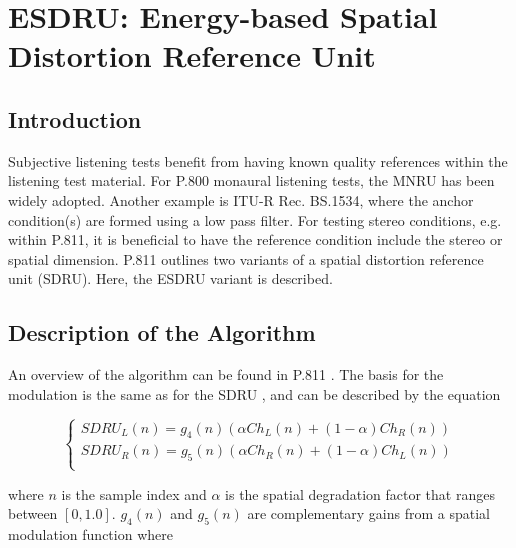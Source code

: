 
\chapter{ESDRU: Energy-based Spatial Distortion Reference Unit}

\section{Introduction}

Subjective listening tests benefit from having known quality references within
the listening test material. For P.800 monaural listening tests, the MNRU has
been widely adopted. Another example is ITU-R Rec. BS.1534, where the anchor condition(s)
are formed using a low pass filter. For testing stereo conditions, e.g. within
P.811, it is beneficial to have the reference condition include the stereo or 
spatial dimension. P.811 outlines two variants of a spatial distortion reference
unit (SDRU). Here, the ESDRU variant is described.



\section{Description of the Algorithm}

An overview of the algorithm can be found in P.811 \cite{P.811}. The basis for
the modulation is the same as for the SDRU \cite{P.811}, and can be described by
the equation

  \[
    \left\{
       \begin{array}{ll}
         {SDRU}_L(n) = g_4(n) \left( \alpha Ch_L(n)+(1-\alpha)Ch_R(n) \right) \\
         {SDRU}_R(n) = g_5(n) \left( \alpha Ch_R(n)+(1-\alpha)Ch_L(n) \right) \\
       \end{array}
     \right.
  \]

where $n$ is the sample index and $\alpha$ is the spatial degradation factor that
ranges between $[0,1.0]$. $g_4(n)$ and $g_5(n)$ are complementary gains from a
spatial modulation function where
 
